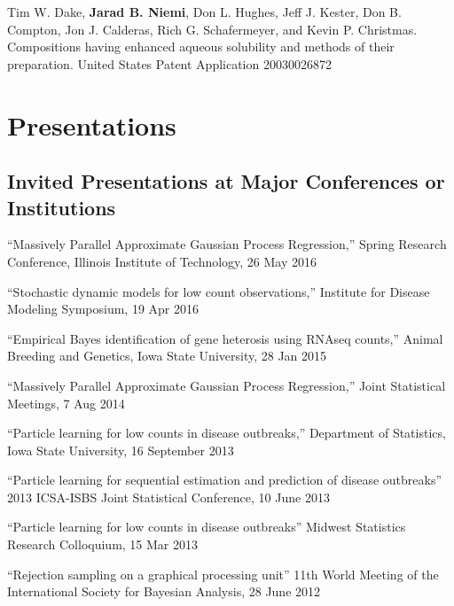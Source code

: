 \documentclass[overlapped,line]{res}
\begin{document}
\begin{resume}
Tim W. Dake, {\bf Jarad B. Niemi}, Don L. Hughes, Jeff J. Kester, Don B. Compton, Jon J. Calderas, Rich G. Schafermeyer, and Kevin P. Christmas. Compositions having enhanced aqueous solubility and methods of their preparation. United States Patent Application 20030026872 %



\section{\bf Presentations}

\vspace{-0.2in}

\subsection{\bf Invited Presentations at Major Conferences or Institutions} \vspace{-0.2in}

{\small

``Massively Parallel Approximate Gaussian Process Regression,'' Spring Research Conference, Illinois Institute of Technology, 26 May 2016 

``Stochastic dynamic models for low count observations,'' Institute for Disease Modeling Symposium, 19 Apr 2016

``Empirical Bayes identification of gene heterosis using RNAseq counts,'' Animal Breeding and Genetics, Iowa State University, 28 Jan 2015 

``Massively Parallel Approximate Gaussian Process Regression,'' Joint Statistical Meetings, 7 Aug 2014 

``Particle learning for low counts in disease outbreaks,'' Department of Statistics, Iowa State University, 16 September 2013 

``Particle learning for sequential estimation and prediction of disease outbreaks''  2013 ICSA-ISBS Joint Statistical Conference, 10 June 2013 

``Particle learning for low counts in disease outbreaks'' Midwest Statistics Research Colloquium, 15 Mar 2013 

``Rejection sampling on a graphical processing unit'' 11th World Meeting of the International Society for Bayesian Analysis, 28 June 2012 

}
\end{resume}
\end{document}
